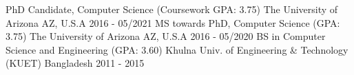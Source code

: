 

\begin{cventries}

  \cventry
    {PhD Candidate, Computer Science (Coursework GPA: 3.75)} %
    {The University of Arizona} %
    {AZ, U.S.A} %
    {2016 - 05/2021} %
    {}
    {}
  \vspace*{-2mm}
  \cventry
    {MS towards PhD, Computer Science (GPA: 3.75)} %
    {The University of Arizona} %
    {AZ, U.S.A} %
    {2016 - 05/2020} %
    {}
    {}
  \vspace*{-2mm}
  \cventry
    {BS in Computer Science and Engineering (GPA: 3.60)} %
    {Khulna Univ. of Engineering \& Technology (KUET)} %
    {Bangladesh} %
    {2011 - 2015} %
    {}
    {}

\end{cventries}
